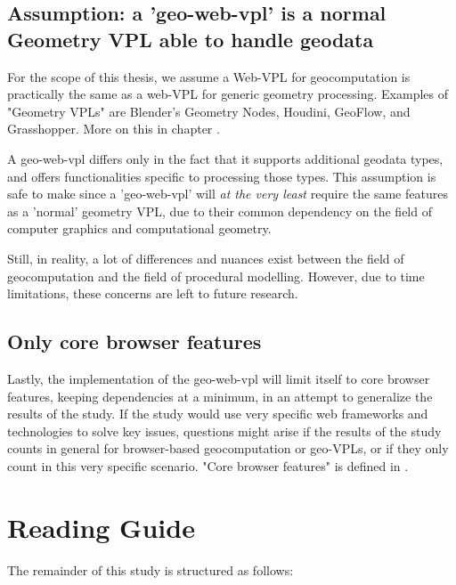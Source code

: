 \subsection*{Assumption: a '\ac{geo-web-vpl}' is a normal Geometry VPL able to handle geodata}
For the scope of this thesis, we assume a Web-VPL for geocomputation is practically the same as a web-VPL for generic geometry processing.
Examples of "Geometry VPLs" are Blender's Geometry Nodes, Houdini, GeoFlow, and Grasshopper.
More on this in chapter .

A geo-web-vpl differs only in the fact that it supports additional geodata types, and offers functionalities specific to processing those types.  
This assumption is safe to make since a 'geo-web-vpl' will \emph{at the very least} require the same features as a 'normal' geometry VPL, due to their common dependency on the field of computer graphics and computational geometry.

Still, in reality, a lot of differences and nuances exist between the field of geocomputation and the field of procedural modelling. 
However, due to time limitations, these concerns are left to future research.
 
\subsection*{Only core browser features}
Lastly, the implementation of the geo-web-vpl will limit itself to core browser features, keeping dependencies at a minimum, in an attempt to generalize the results of the study.
If the study would use very specific web frameworks and technologies to solve key issues, questions might arise if the results of the study counts in general for browser-based geocomputation or geo-VPLs, or if they only count in this very specific scenario. 
"Core browser features" is defined in .

\newpage
\section{Reading Guide}
The remainder of this study is structured as follows:

